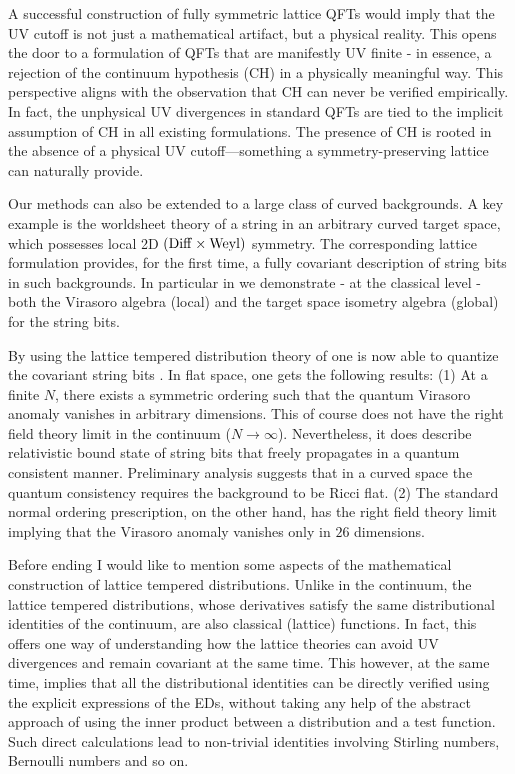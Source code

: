 \documentclass[
article,12pt]{article}
\begin{document}
A successful construction of fully symmetric lattice QFTs would imply that the UV cutoff is not just a mathematical artifact, but a physical reality. 
This opens the door to a formulation of QFTs that are manifestly UV finite - in essence, a rejection of the continuum hypothesis (CH) in a 
physically meaningful way. This perspective aligns with the observation that CH can never be verified empirically. In fact, the unphysical UV 
divergences in standard QFTs are tied to the implicit assumption of CH in all existing formulations. The presence of CH is rooted in the absence 
of a physical UV cutoff—something a symmetry-preserving lattice can naturally provide.

Our methods can also be extended to a large class of curved backgrounds. A key example is the worldsheet theory of a string in an arbitrary 
curved target space, which possesses local 2D $ (\rm{Diff} \times \rm{Weyl}) $ symmetry. The corresponding lattice formulation \cite{covlatt1} 
provides, for the first time, a fully covariant description of string bits in such backgrounds. In particular in \cite{covlatt1} we demonstrate - at the classical level - both the Virasoro algebra (local) and the target space isometry algebra (global) for the string bits. 

By using the lattice tempered distribution theory of \cite{covlatt2} one is now able to quantize the covariant string bits \cite{q-string-bits}. In flat 
space, one gets the following results: (1) At a finite $N$, there exists a symmetric ordering such that the quantum Virasoro anomaly vanishes in 
arbitrary dimensions. This of course does not have the right field theory limit in the continuum ($N \to \infty$). Nevertheless, it does describe 
relativistic bound state of string bits that freely propagates in a quantum consistent manner. Preliminary analysis suggests that in a curved 
space the quantum consistency requires the background to be Ricci flat. (2) The standard normal ordering prescription, on the other hand, has 
the right field theory limit implying that the Virasoro anomaly vanishes only in $26$ dimensions.

Before ending I would like to mention some aspects of the mathematical construction of lattice tempered distributions. Unlike in the continuum, 
the lattice tempered distributions, whose derivatives satisfy the same distributional identities of the continuum, are also classical (lattice) 
functions. In fact, this offers one way of understanding how the lattice theories can avoid UV divergences and remain covariant at the same 
time. This however, at the same time, implies that all the distributional identities can be directly verified using the explicit expressions of the 
EDs, without taking any help of the abstract approach of using the inner product between a distribution and a test function. Such direct calculations lead to non-trivial identities involving Stirling numbers, Bernoulli numbers and so on. 
\end{document}

